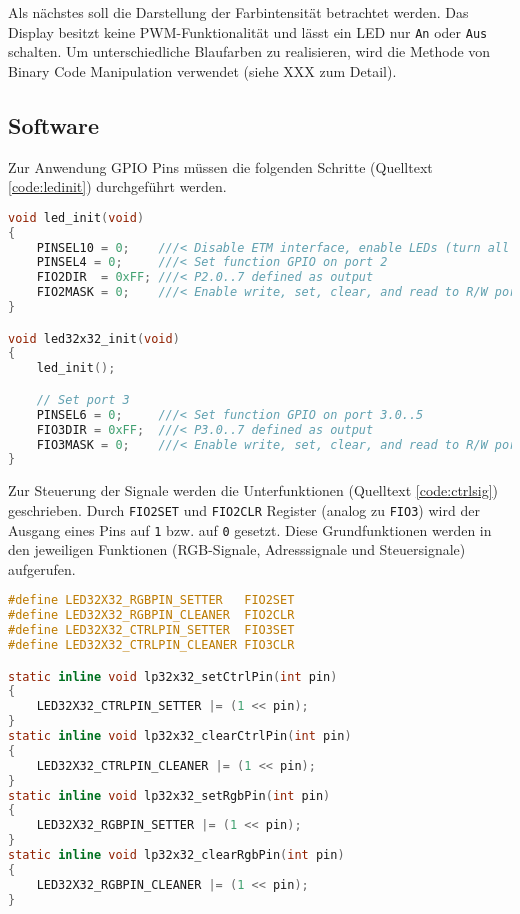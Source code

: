 Als nächstes soll die Darstellung der Farbintensität betrachtet werden. Das Display besitzt keine PWM-Funktionalität und lässt ein LED nur \texttt{An} oder \texttt{Aus} schalten. Um unterschiedliche Blaufarben zu realisieren, wird die Methode von Binary Code Manipulation verwendet (siehe XXX zum Detail). 

\subsection{Software}
 Zur Anwendung GPIO Pins müssen die folgenden Schritte (Quelltext \ref{code:ledinit}) durchgeführt werden.
\begin{lstlisting}[language={c}, caption={Initialisierung von GPIO als Output}, label={code:ledinit}]
void led_init(void)
{
    PINSEL10 = 0;    ///< Disable ETM interface, enable LEDs (turn all LEDs on)
    PINSEL4 = 0;     ///< Set function GPIO on port 2
    FIO2DIR  = 0xFF; ///< P2.0..7 defined as output
    FIO2MASK = 0;    ///< Enable write, set, clear, and read to R/W port 2
}

void led32x32_init(void)
{
    led_init();

    // Set port 3
    PINSEL6 = 0;     ///< Set function GPIO on port 3.0..5
    FIO3DIR = 0xFF;  ///< P3.0..7 defined as output
    FIO3MASK = 0;    ///< Enable write, set, clear, and read to R/W port 3
}
\end{lstlisting}

Zur Steuerung der Signale werden die Unterfunktionen (Quelltext \ref{code:ctrlsig}) geschrieben. Durch \texttt{FIO2SET} und \texttt{FIO2CLR} Register (analog zu \texttt{FIO3}) wird der Ausgang eines Pins auf \texttt{1} bzw. auf \texttt{0} gesetzt. Diese Grundfunktionen werden in den jeweiligen Funktionen (RGB-Signale, Adresssignale und Steuersignale) aufgerufen.

\begin{lstlisting}[language={c}, caption={Funktionen zur Steuerung der Signale.}, label={code:ctrlsig}]
#define LED32X32_RGBPIN_SETTER   FIO2SET
#define LED32X32_RGBPIN_CLEANER  FIO2CLR
#define LED32X32_CTRLPIN_SETTER  FIO3SET
#define LED32X32_CTRLPIN_CLEANER FIO3CLR

static inline void lp32x32_setCtrlPin(int pin)
{
    LED32X32_CTRLPIN_SETTER |= (1 << pin);
}
static inline void lp32x32_clearCtrlPin(int pin)
{
    LED32X32_CTRLPIN_CLEANER |= (1 << pin);
}
static inline void lp32x32_setRgbPin(int pin)
{
    LED32X32_RGBPIN_SETTER |= (1 << pin);
}
static inline void lp32x32_clearRgbPin(int pin)
{
    LED32X32_RGBPIN_CLEANER |= (1 << pin);
}
\end{lstlisting}

